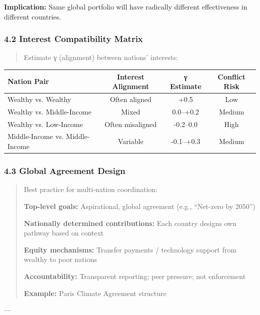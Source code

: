 \textbf{Implication:} Same global portfolio will have radically different effectiveness in different countries.

\subsubsection*{4.2 Interest Compatibility Matrix}

\begin{quote}
Estimate γ (alignment) between nations' interests:
\end{quote}

\begin{center}
\begin{tabular}{@{}lccc@{}}
\toprule
\textbf{Nation Pair} & \textbf{Interest Alignment} & \textbf{γ Estimate} & \textbf{Conflict Risk} \\
\midrule
Wealthy vs. Wealthy & Often aligned & +0.5 & Low \\
Wealthy vs. Middle-Income & Mixed & 0.0–+0.2 & Medium \\
Wealthy vs. Low-Income & Often misaligned & -0.2–0.0 & High \\
Middle-Income vs. Middle-Income & Variable & -0.1–+0.3 & Medium \\
\midrule
\end{tabular}
\end{center}

\subsubsection*{4.3 Global Agreement Design}

\begin{quote}
Best practice for multi-nation coordination:

\textbf{Top-level goals:} Aspirational, global agreement (e.g., ``Net-zero by 2050'')

\textbf{Nationally determined contributions:} Each country designs own pathway based on context

\textbf{Equity mechanisms:} Transfer payments / technology support from wealthy to poor nations

\textbf{Accountability:} Transparent reporting; peer pressure; not enforcement

\textbf{Example:} Paris Climate Agreement structure
\end{quote}

---


